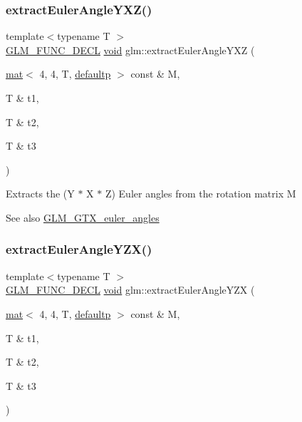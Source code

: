 \subsubsection{\texorpdfstring{extract\+Euler\+Angle\+Y\+X\+Z()}{extractEulerAngleYXZ()}}
{\footnotesize\ttfamily template$<$typename T $>$ \\
\hyperlink{setup_8hpp_ab2d052de21a70539923e9bcbf6e83a51}{G\+L\+M\+\_\+\+F\+U\+N\+C\+\_\+\+D\+E\+CL} \hyperlink{_s_d_l__opengles2__gl2ext_8h_ae5d8fa23ad07c48bb609509eae494c95}{void} glm\+::extract\+Euler\+Angle\+Y\+XZ (\begin{DoxyParamCaption}\item[{\hyperlink{structglm_1_1mat}{mat}$<$ 4, 4, T, \hyperlink{namespaceglm_a36ed105b07c7746804d7fdc7cc90ff25a9d21ccd8b5a009ec7eb7677befc3bf51}{defaultp} $>$ const \&}]{M,  }\item[{T \&}]{t1,  }\item[{T \&}]{t2,  }\item[{T \&}]{t3 }\end{DoxyParamCaption})}

Extracts the (Y $\ast$ X $\ast$ Z) Euler angles from the rotation matrix M \begin{DoxySeeAlso}{See also}
\hyperlink{group__gtx__euler__angles}{G\+L\+M\+\_\+\+G\+T\+X\+\_\+euler\+\_\+angles} 
\end{DoxySeeAlso}
\mbox{\label{group__gtx__euler__angles_ga9049b78466796c0de2971756e25b93d3}} 
\subsubsection{\texorpdfstring{extract\+Euler\+Angle\+Y\+Z\+X()}{extractEulerAngleYZX()}}
{\footnotesize\ttfamily template$<$typename T $>$ \\
\hyperlink{setup_8hpp_ab2d052de21a70539923e9bcbf6e83a51}{G\+L\+M\+\_\+\+F\+U\+N\+C\+\_\+\+D\+E\+CL} \hyperlink{_s_d_l__opengles2__gl2ext_8h_ae5d8fa23ad07c48bb609509eae494c95}{void} glm\+::extract\+Euler\+Angle\+Y\+ZX (\begin{DoxyParamCaption}\item[{\hyperlink{structglm_1_1mat}{mat}$<$ 4, 4, T, \hyperlink{namespaceglm_a36ed105b07c7746804d7fdc7cc90ff25a9d21ccd8b5a009ec7eb7677befc3bf51}{defaultp} $>$ const \&}]{M,  }\item[{T \&}]{t1,  }\item[{T \&}]{t2,  }\item[{T \&}]{t3 }\end{DoxyParamCaption})}

